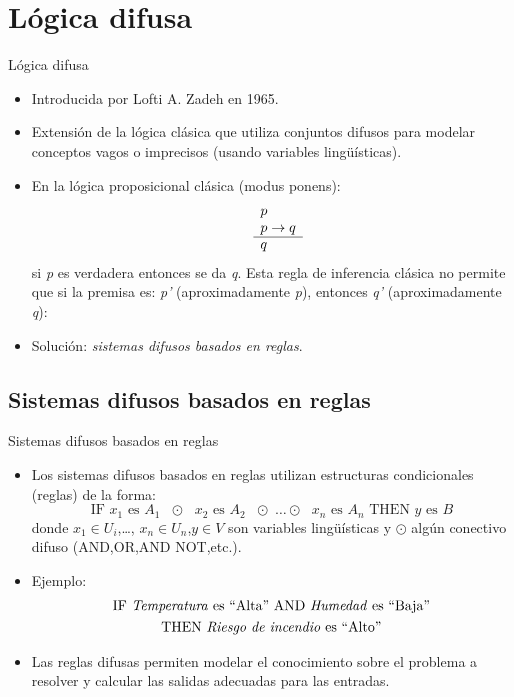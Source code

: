 \documentclass{beamer}
\begin{document}
\section{Lógica difusa}

\begin{frame}{Lógica difusa}
	\begin{itemize}
		\item Introducida por Lofti A. Zadeh en 1965.
		\item Extensión de la lógica clásica que utiliza conjuntos difusos para modelar conceptos vagos o imprecisos (usando variables lingüísticas).
		\item En la lógica proposicional clásica (modus ponens):
		\begin{equation}
				\begin{array}{rl}
				    & p \\
				    & p \to q \\
				    \cline{2-2}
				    & q
				  \end{array}
		\end{equation}
		si \emph{p} es verdadera entonces se da \emph{q}. Esta regla de inferencia clásica no permite que si la premisa es: \emph{p'} (aproximadamente \emph{p}), entonces \emph{q'} (aproximadamente \emph{q}):

		\item Solución: \emph{sistemas difusos basados en reglas}.
	\end{itemize}
\end{frame}

\subsection{Sistemas difusos basados en reglas}
\begin{frame}{Sistemas difusos basados en reglas}
	\begin{itemize}
		\item Los sistemas difusos basados en reglas utilizan estructuras condicionales (reglas) de la forma:
		\begin{equation}
		\text{IF $x_{1}$ es $A_{1}$ $\odot$ $x_{2}$ es $A_{2}$ $\odot$ \ldots $\odot$ $x_{n}$ es $A_{n}$ THEN $y$ es $B$}
		\end{equation}
		donde $x_{1} \in U_{i}$,\ldots, $x_{n} \in U_{n}$,$y \in V$ son variables lingüísticas y $\odot$ algún conectivo difuso (AND,OR,AND NOT,etc.).
		
		\item Ejemplo: 
		\begin{multline}
		\text{IF \emph{Temperatura} es ``Alta'' AND \emph{Humedad} es ``Baja''}	\\
		\text{THEN \emph{Riesgo de incendio} es ``Alto''}
		\end{multline}
		\item Las reglas difusas permiten modelar el conocimiento sobre el problema a resolver y calcular las salidas adecuadas para las entradas.
	\end{itemize}
\end{frame}
\end{document}
